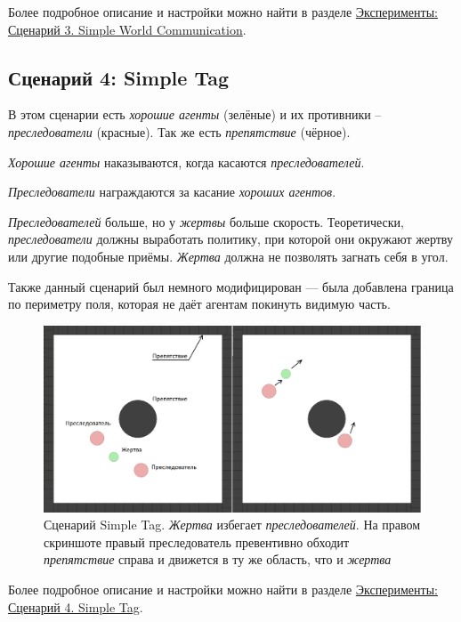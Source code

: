 Более подробное описание и настройки можно найти в разделе \hyperref[exp-swc]{Эксперименты: Сценарий 3. Simple World Communication}.

\subsection{Сценарий 4: Simple Tag} \label{intro-st}

В этом сценарии есть \textit{хорошие агенты} (зелёные) и их противники – \textit{преследователи} (красные). Так же есть \textit{препятствие} (чёрное).

\textit{Хорошие агенты} наказываются, когда касаются \textit{преследователей}.

\textit{Преследователи} награждаются за касание \textit{хороших агентов}.

\textit{Преследователей} больше, но у \textit{жертвы} больше скорость. Теоретически, \textit{преследователи} должны выработать политику, при которой они окружают жертву или другие подобные приёмы. \textit{Жертва} должна не позволять загнать себя в угол.

Также данный сценарий был немного модифицирован --- была добавлена граница по периметру поля, которая не даёт агентам покинуть видимую часть.

\begin{figure}[ht!] 
	\center
	\includegraphics [scale=0.41] {my_folder/images/intro/st.png}
	\caption{Сценарий Simple Tag. \textit{Жертва} избегает \textit{преследователей}. На правом скриншоте правый преследователь превентивно обходит \textit{препятствие} справа и движется в ту же область, что и \textit{жертва}}
	\label{fig:st}  
\end{figure}

Более подробное описание и настройки можно найти в разделе \hyperref[exp-st]{Эксперименты: Сценарий 4. Simple Tag}.

